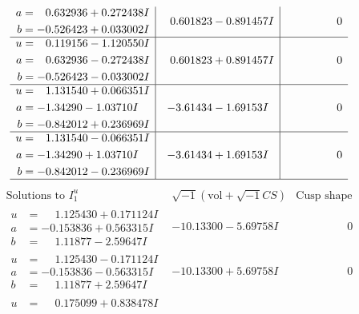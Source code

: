 \documentclass[1p]{elsarticle_modified}
\theoremstyle{definition}
\newcommand{\I}{\sqrt{-1}}
\begin{document}
$$\begin{array}{c|c|c}
\begin{aligned}
a &= \phantom{-}0.632936 + 0.272438 I \\
b &= -0.526423 + 0.033002 I\end{aligned}
 & \phantom{-}0.601823 - 0.891457 I & \phantom{-0.000000 } 0 \\ \hline\begin{aligned}
u &= \phantom{-}0.119156 - 1.120550 I \\
a &= \phantom{-}0.632936 - 0.272438 I \\
b &= -0.526423 - 0.033002 I\end{aligned}
 & \phantom{-}0.601823 + 0.891457 I & \phantom{-0.000000 } 0 \\ \hline\begin{aligned}
u &= \phantom{-}1.131540 + 0.066351 I \\
a &= -1.34290 - 1.03710 I \\
b &= -0.842012 + 0.236969 I\end{aligned}
 & -3.61434 - 1.69153 I & \phantom{-0.000000 } 0 \\ \hline\begin{aligned}
u &= \phantom{-}1.131540 - 0.066351 I \\
a &= -1.34290 + 1.03710 I \\
b &= -0.842012 - 0.236969 I\end{aligned}
 & -3.61434 + 1.69153 I & \phantom{-0.000000 } 0\\
 \hline 
 \end{array}$$\newpage$$\begin{array}{c|c|c}  
\text{Solutions to }I^u_{1}& \I (\text{vol} + \sqrt{-1}CS) & \text{Cusp shape}\\
 \hline 
\begin{aligned}
u &= \phantom{-}1.125430 + 0.171124 I \\
a &= -0.153836 + 0.563315 I \\
b &= \phantom{-}1.11877 - 2.59647 I\end{aligned}
 & -10.13300 - 5.69758 I & \phantom{-0.000000 } 0 \\ \hline\begin{aligned}
u &= \phantom{-}1.125430 - 0.171124 I \\
a &= -0.153836 - 0.563315 I \\
b &= \phantom{-}1.11877 + 2.59647 I\end{aligned}
 & -10.13300 + 5.69758 I & \phantom{-0.000000 } 0 \\ \hline\begin{aligned}
u &= \phantom{-}0.175099 + 0.838478 I \\

\end{aligned}
\end{array}$$
\end{document}
